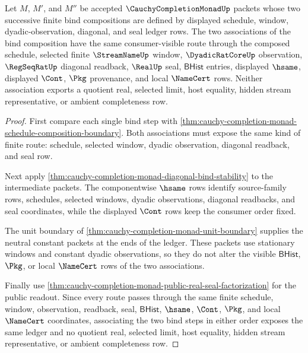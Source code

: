\begin{theorem}
\label{thm:cauchy-completion-monad-bind-associativity-ledger}
Let $M$, $M'$, and $M''$ be accepted $\CauchyCompletionMonadUp$ packets whose two successive finite bind compositions are defined by displayed schedule, window, dyadic-observation, diagonal, and seal ledger rows. The two associations of the bind composition have the same consumer-visible route through the composed schedule, selected finite $\StreamNameUp$ window, $\DyadicRatCoreUp$ observation, $\RegSeqRatUp$ diagonal readback, $\RealUp$ seal, $\mathsf{BHist}$ entries, displayed $\hsame$, displayed $\Cont$, $\Pkg$ provenance, and local $\NameCert$ rows. Neither association exports a quotient real, selected limit, host equality, hidden stream representative, or ambient completeness row.
\end{theorem}
\begin{proof}
First compare each single bind step with \autoref{thm:cauchy-completion-monad-schedule-composition-boundary}. Both associations must expose the same kind of finite route: schedule, selected window, dyadic observation, diagonal readback, and seal row.

Next apply \autoref{thm:cauchy-completion-monad-diagonal-bind-stability} to the intermediate packets. The componentwise $\hsame$ rows identify source-family rows, schedules, selected windows, dyadic observations, diagonal readbacks, and seal coordinates, while the displayed $\Cont$ rows keep the consumer order fixed.

The unit boundary of \autoref{thm:cauchy-completion-monad-unit-boundary} supplies the neutral constant packets at the ends of the ledger. These packets use stationary windows and constant dyadic observations, so they do not alter the visible $\mathsf{BHist}$, $\Pkg$, or local $\NameCert$ rows of the two associations.

Finally use \autoref{thm:cauchy-completion-monad-public-real-seal-factorization} for the public readout. Since every route passes through the same finite schedule, window, observation, readback, seal, $\mathsf{BHist}$, $\hsame$, $\Cont$, $\Pkg$, and local $\NameCert$ coordinates, associating the two bind steps in either order exposes the same ledger and no quotient real, selected limit, host equality, hidden stream representative, or ambient completeness row.
\end{proof}

